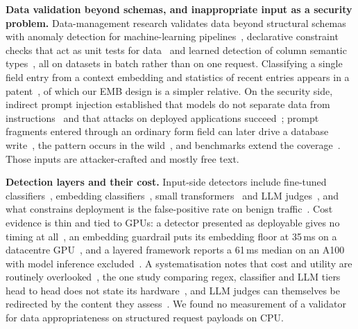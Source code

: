 \documentclass[journal]{IEEEtran}
\begin{document}
\textbf{Data validation beyond schemas, and inappropriate input as a security problem.} Data-management research validates data beyond structural schemas with anomaly detection for
machine-learning pipelines~\cite{polyzotis2019datavalidation}, declarative constraint checks that act
as unit tests for data~\cite{schelter2018deequ} and learned detection of column semantic
types~\cite{hulsebos2019sherlock}, all on datasets in batch rather than on one request. Classifying a
single field entry from a context embedding and statistics of recent entries appears in a
patent~\cite{banerjee2025contextembedding}, of which our EMB design is a simpler relative. On the
security side, indirect prompt injection established that models do not separate data from
instructions~\cite{greshake2023indirect} and that attacks on deployed applications
succeed~\cite{kaya2026chatbotplugins}; prompt fragments entered through an ordinary form field can
later drive a database write~\cite{pedro2025p2sql}, the pattern occurs in the
wild~\cite{khodayari2026ipiwild}, and benchmarks extend the coverage~\cite{yi2025bipia,evtimov2025wasp}.
Those inputs are attacker-crafted and mostly free text.

\textbf{Detection layers and their cost.} Input-side detectors include fine-tuned
classifiers~\cite{jacob2025promptshield}, embedding
classifiers~\cite{ayub2024embedding,ahmed2026reflexguard}, small
transformers~\cite{datta2025javelinguard} and LLM judges~\cite{rebedea2023nemo}, and what constrains
deployment is the false-positive rate on benign traffic~\cite{li2024injecguard}. Cost evidence is thin
and tied to GPUs: a detector presented as deployable gives no timing at
all~\cite{jacob2025promptshield}, an embedding guardrail puts its embedding floor at 35\,ms on a
datacentre GPU~\cite{ahmed2026reflexguard}, and a layered framework reports a 61\,ms median on an A100
with model inference excluded~\cite{saleem2026layered}. A systematisation notes that cost and utility
are routinely overlooked~\cite{wang2026sokguardrails}, the one study comparing regex, classifier and
LLM tiers head to head does not state its hardware~\cite{maiorano2026tradeoffs}, and LLM judges can
themselves be redirected by the content they assess~\cite{shi2024judgeattack}. We found no measurement
of a validator for data appropriateness on structured request payloads on CPU.
\end{document}
